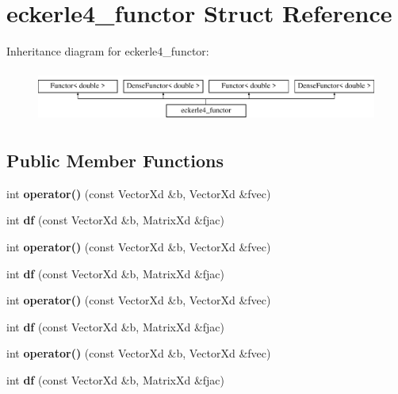 \hypertarget{structeckerle4__functor}{}\section{eckerle4\+\_\+functor Struct Reference}
\label{structeckerle4__functor}
Inheritance diagram for eckerle4\+\_\+functor\+:\begin{figure}[H]
\begin{center}
\leavevmode
\includegraphics[height=1.728395cm]{structeckerle4__functor}
\end{center}
\end{figure}
\subsection*{Public Member Functions}
\begin{DoxyCompactItemize}
\item 
\mbox{\label{structeckerle4__functor_a887ac1aad7fb9ae0f6512541e5d42537}} 
int {\bfseries operator()} (const Vector\+Xd \&b, Vector\+Xd \&fvec)
\item 
\mbox{\label{structeckerle4__functor_a0c740e94fa714be83216d82c9d746d9e}} 
int {\bfseries df} (const Vector\+Xd \&b, Matrix\+Xd \&fjac)
\item 
\mbox{\label{structeckerle4__functor_a887ac1aad7fb9ae0f6512541e5d42537}} 
int {\bfseries operator()} (const Vector\+Xd \&b, Vector\+Xd \&fvec)
\item 
\mbox{\label{structeckerle4__functor_a0c740e94fa714be83216d82c9d746d9e}} 
int {\bfseries df} (const Vector\+Xd \&b, Matrix\+Xd \&fjac)
\item 
\mbox{\label{structeckerle4__functor_a887ac1aad7fb9ae0f6512541e5d42537}} 
int {\bfseries operator()} (const Vector\+Xd \&b, Vector\+Xd \&fvec)
\item 
\mbox{\label{structeckerle4__functor_a0c740e94fa714be83216d82c9d746d9e}} 
int {\bfseries df} (const Vector\+Xd \&b, Matrix\+Xd \&fjac)
\item 
\mbox{\label{structeckerle4__functor_a887ac1aad7fb9ae0f6512541e5d42537}} 
int {\bfseries operator()} (const Vector\+Xd \&b, Vector\+Xd \&fvec)
\item 
\mbox{\label{structeckerle4__functor_a0c740e94fa714be83216d82c9d746d9e}} 
int {\bfseries df} (const Vector\+Xd \&b, Matrix\+Xd \&fjac)
\end{DoxyCompactItemize}
